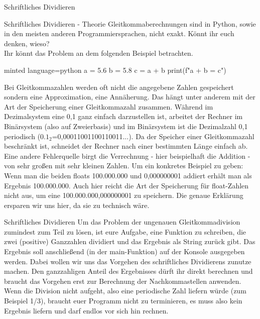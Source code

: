 \begin{task}[points=auto]{Schriftliches Dividieren}
    \begin{subtask*}[points=0]{Schriftliches Dividieren - Theorie }
        Gleitkommaberechnungen sind in Python, sowie in den meisten anderen Programmiersprachen, nicht exakt. Könnt ihr euch denken, wieso?\\
        Ihr könnt das Problem an dem folgenden Beispiel betrachten.
        \begin{codeBlock}[]{minted language=python}
            a = 5.6
            b = 5.8
            c = a + b
            print(f"{a} + {b} = {c}")
        \end{codeBlock}

        \begin{solution}
            Bei Gleitkommazahlen werden oft nicht die angegebene Zahlen gespeichert sondern eine Approximation, eine Annäherung. Das hängt unter anderem mit der Art der Speicherung einer Gleitkommazahl zusammen. Während im Dezimalsystem eine 0,1 ganz einfach darzustellen ist, arbeitet der Rechner im Binärsystem (also auf Zweierbasis) und im Binärsystem ist die Dezimalzahl 0,1 periodisch ($0.1_2$=0,00011001100110011...). Da der Speicher einer Gleitkommazahl beschränkt ist, schneidet der Rechner nach einer bestimmten Länge einfach ab.\\
            Eine andere Fehlerquelle birgt die Verrechnung - hier beispielhaft die Addition - von sehr großen mit sehr kleinen Zahlen. Um ein konkretes Beispiel zu geben: Wenn man die beiden floats 100.000.000 und 0,000000001 addiert erhält man als Ergebnis 100.000.000. Auch hier reicht die Art der Speicherung für float-Zahlen nicht aus, um eine 100.000.000,000000001 zu speichern. Die genaue Erklärung ersparen wir uns hier, da sie zu technisch wäre.
        \end{solution}
    \end{subtask*}
    \begin{subtask*}[points=0]{Schriftliches Dividieren }
        Um das Problem der ungenauen Gleitkommadivision zumindest zum Teil zu lösen, ist eure Aufgabe, eine Funktion zu schreiben, die zwei (positive) Ganzzahlen dividiert und das Ergebnis als String zurück gibt. Das Ergebnis soll anschließend (in der main-Funktion) auf der Konsole ausgegeben werden. Dabei wollen wir uns das Vorgehen des schriftliches Dividierens zunutze machen. Den ganzzahligen Anteil des Ergebnisses dürft ihr direkt berechnen und braucht das Vorgehen erst zur Berechnung der Nachkommastellen anwenden. Wenn die Division nicht aufgeht, also eine periodische Zahl liefern würde (zum Beispiel 1/3), braucht euer Programm nicht zu terminieren, es muss also kein Ergebnis liefern und darf endlos vor sich hin rechnen.


\end{subtask*}
\end{task}

